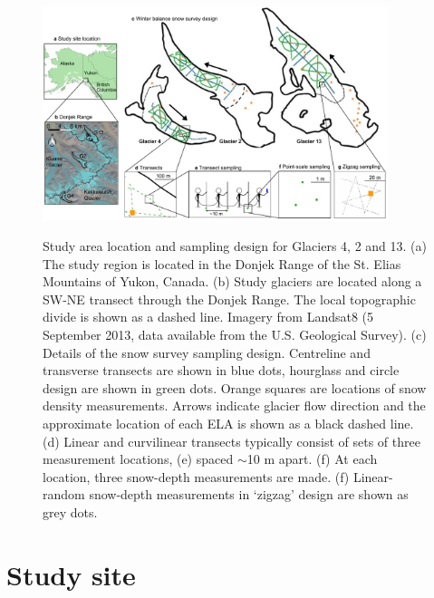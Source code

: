 \documentclass[twocolumn, letterpaper]{igs}
\begin{document}
\begin{figure}
	\centering
	\includegraphics[width =0.9\textwidth]{Sampling.pdf}\\
	\caption{Study area location and sampling design for Glaciers 4, 2 and 13. (a) The study region is located in the Donjek Range of the St. Elias Mountains of Yukon, Canada. (b) Study glaciers are located along a SW-NE transect through the Donjek Range. The local topographic divide is shown as a dashed line. Imagery from Landsat8 (5 September 2013, data available from the U.S. Geological Survey). (c) Details of the snow survey sampling design. Centreline and transverse transects are shown in blue dots, hourglass and circle design are shown in green dots. Orange squares are locations of snow density measurements. Arrows indicate glacier flow direction and the approximate location of each ELA is shown as a black dashed line. (d) Linear and curvilinear transects typically consist of sets of three measurement locations, (e) spaced $\sim$10 m apart. (f) At each location, three snow-depth measurements are made. (f) Linear-random snow-depth measurements in `zigzag' design are shown as grey dots.}
	\label{fig:Sampling}
\end{figure}

\section{Study site}
\end{document}
